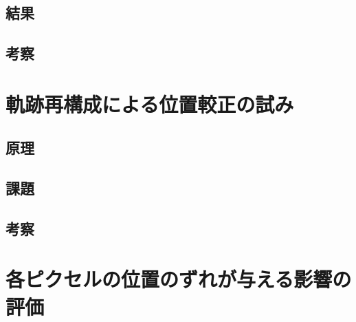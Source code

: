 \documentclass[Yonemoto_master.tex]{subfiles}
\begin{document}
\subsection{結果}
\subsection{考察}

\section{軌跡再構成による位置較正の試み}
\subsection{原理}
\subsection{課題}
\subsection{考察}

\section{各ピクセルの位置のずれが与える影響の評価}
\end{document}
